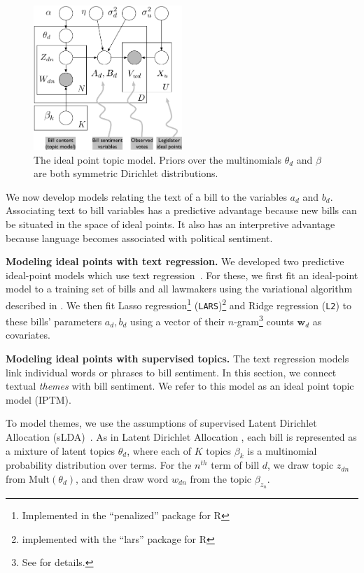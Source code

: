 \begin{figure}[t]
\center
\includegraphics[width=0.5\textwidth]{chapter_predicting_votes_with_text/figures/ideal-point-topic-model.pdf}
\caption{The ideal point topic model.  Priors over the multinomials
$\theta_d$ and $\beta$ are both symmetric Dirichlet distributions.}
\label{fig:legis_gm}
\end{figure}

We now develop models relating the text of a bill to the variables
$a_d$ and $b_d$.  Associating text to bill variables has a predictive
advantage because new bills can be situated in the space of ideal
points.  It also has an interpretive advantage because language
becomes associated with political sentiment.

\textbf{Modeling ideal points with text regression.} We developed two
predictive ideal-point models which use text
regression~\citep{kogan:2009}.  For these, we first fit an ideal-point
model to a training set of bills and all lawmakers using the
variational algorithm described in .  We then fit Lasso
regression\footnote{Implemented in the ``penalized'' package for R}
(\verb!LARS!)\footnote{implemented with the ``lars'' package for R}
and Ridge regression (\verb!L2!) to these bills' parameters $a_d, b_d$
using a vector of their $n$-gram\footnote{See  for
  details.}  counts $\bm w_{d}$ as covariates.

\textbf{Modeling ideal points with supervised topics.} The text
regression models link individual words or phrases to bill sentiment.
In this section, we connect textual \emph{themes} with bill sentiment.
We refer to this model as an ideal point topic model (IPTM).

To model themes, we use the assumptions of supervised Latent Dirichlet
Allocation (sLDA)~\citep{blei:2008}.  As in Latent Dirichlet Allocation
\citep{blei:2003}, each bill is represented as a mixture of latent
topics $\theta_d$, where each of $K$ topics $\beta_k$ is a multinomial
probability distribution over terms.  For the $n^{th}$ term of bill
$d$, we draw topic $z_{dn}$ from $\mbox{Mult}(\theta_d)$, and then
draw word $w_{dn}$ from the topic $\beta_{z_n}$.

